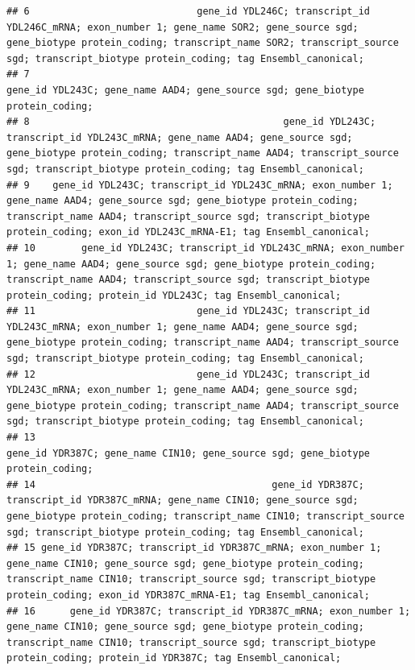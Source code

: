 \documentclass[
]{book}
\begin{document}
\begin{verbatim}
## 6                             gene_id YDL246C; transcript_id YDL246C_mRNA; exon_number 1; gene_name SOR2; gene_source sgd; gene_biotype protein_coding; transcript_name SOR2; transcript_source sgd; transcript_biotype protein_coding; tag Ensembl_canonical;
## 7                                                                                                                                                                               gene_id YDL243C; gene_name AAD4; gene_source sgd; gene_biotype protein_coding;
## 8                                            gene_id YDL243C; transcript_id YDL243C_mRNA; gene_name AAD4; gene_source sgd; gene_biotype protein_coding; transcript_name AAD4; transcript_source sgd; transcript_biotype protein_coding; tag Ensembl_canonical;
## 9    gene_id YDL243C; transcript_id YDL243C_mRNA; exon_number 1; gene_name AAD4; gene_source sgd; gene_biotype protein_coding; transcript_name AAD4; transcript_source sgd; transcript_biotype protein_coding; exon_id YDL243C_mRNA-E1; tag Ensembl_canonical;
## 10        gene_id YDL243C; transcript_id YDL243C_mRNA; exon_number 1; gene_name AAD4; gene_source sgd; gene_biotype protein_coding; transcript_name AAD4; transcript_source sgd; transcript_biotype protein_coding; protein_id YDL243C; tag Ensembl_canonical;
## 11                            gene_id YDL243C; transcript_id YDL243C_mRNA; exon_number 1; gene_name AAD4; gene_source sgd; gene_biotype protein_coding; transcript_name AAD4; transcript_source sgd; transcript_biotype protein_coding; tag Ensembl_canonical;
## 12                            gene_id YDL243C; transcript_id YDL243C_mRNA; exon_number 1; gene_name AAD4; gene_source sgd; gene_biotype protein_coding; transcript_name AAD4; transcript_source sgd; transcript_biotype protein_coding; tag Ensembl_canonical;
## 13                                                                                                                                                                             gene_id YDR387C; gene_name CIN10; gene_source sgd; gene_biotype protein_coding;
## 14                                         gene_id YDR387C; transcript_id YDR387C_mRNA; gene_name CIN10; gene_source sgd; gene_biotype protein_coding; transcript_name CIN10; transcript_source sgd; transcript_biotype protein_coding; tag Ensembl_canonical;
## 15 gene_id YDR387C; transcript_id YDR387C_mRNA; exon_number 1; gene_name CIN10; gene_source sgd; gene_biotype protein_coding; transcript_name CIN10; transcript_source sgd; transcript_biotype protein_coding; exon_id YDR387C_mRNA-E1; tag Ensembl_canonical;
## 16      gene_id YDR387C; transcript_id YDR387C_mRNA; exon_number 1; gene_name CIN10; gene_source sgd; gene_biotype protein_coding; transcript_name CIN10; transcript_source sgd; transcript_biotype protein_coding; protein_id YDR387C; tag Ensembl_canonical;

\end{verbatim}
\end{document}
